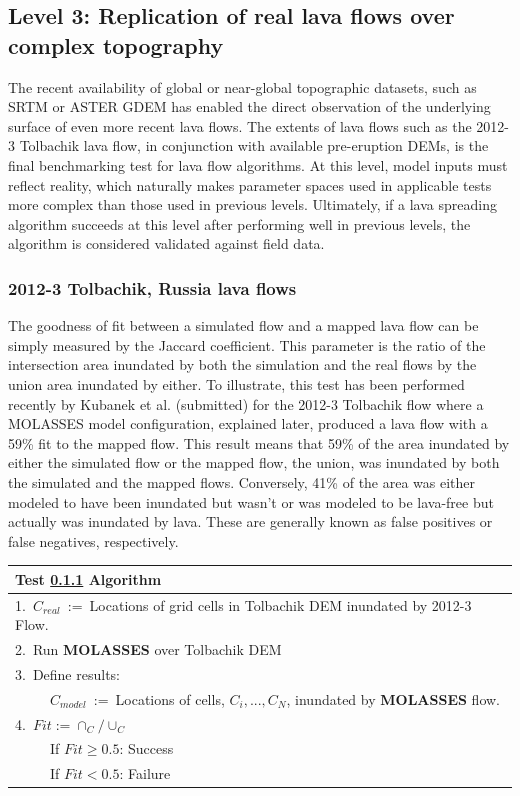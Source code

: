 \documentclass[12pt,letter]{article}
\newcommand{\tabitem}{~~\llap{\textbullet}~~}
\newcommand{\tabitem}{~~\llap{\textbullet}~~}
\begin{document}
	\subsection{Level 3: Replication of real lava flows over complex topography}
		The recent availability of global or near-global topographic datasets, such as SRTM or ASTER GDEM has enabled the direct observation of the underlying surface of even more recent lava flows. The extents of lava flows such as the 2012-3 Tolbachik lava flow, in conjunction with available pre-eruption DEMs, is the final benchmarking test for lava flow algorithms. At this level, model inputs must reflect reality, which naturally makes parameter spaces used in applicable tests more complex than those used in previous levels. Ultimately, if a lava spreading algorithm succeeds at this level after performing well in previous levels, the algorithm is considered validated against field data.

		\subsubsection{2012-3 Tolbachik, Russia lava flows}\label{test:Real_Tolbachik}
			The goodness of fit between a simulated flow and a mapped lava flow can be simply measured by the Jaccard coefficient. This parameter is the ratio of the intersection area inundated by both the simulation and the real flows by the union area inundated by either. To illustrate, this test has been performed recently by Kubanek et al. (submitted) for the 2012-3 Tolbachik flow where a MOLASSES model configuration, explained later, produced a lava flow with a 59\% fit to the mapped flow. This result means that 59\% of the area inundated by either the simulated flow or the mapped flow, the union, was inundated by both the simulated and the mapped flows. Conversely, 41\% of the area was either modeled to have been inundated but wasn't or was modeled to be lava-free but actually was inundated by lava. These are generally known as false positives or false negatives, respectively.
			

			\begin{center}
				\begin{tabular}{l}
					\toprule
					\textbf{Test \ref{test:Real_Tolbachik} Algorithm}\\
					\midrule
					1.~$C_{real}$~:=~Locations of grid cells in Tolbachik DEM inundated by 2012-3 Flow.\\
					2.~Run \textbf{MOLASSES} over Tolbachik DEM\\
					3.~Define results:\\
						~\tabitem $C_{model}$~:=~Locations of cells, $C_i,...,C_N$, inundated by \textbf{MOLASSES} flow.\\
					4.~$Fit:=\cap_C/\cup_C$\\
						~\tabitem If $Fit\ge0.5$: Success\\
						~\tabitem If $Fit<0.5$: Failure\\
					\bottomrule
				\end{tabular}
			\end{center}
			
\end{document}

